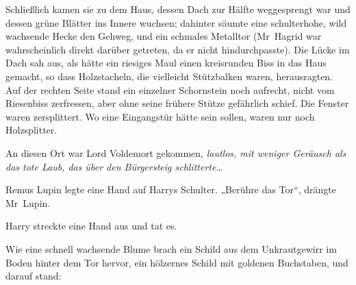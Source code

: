 Schließlich kamen sie zu dem Haus, dessen Dach zur Hälfte weggesprengt war und dessen grüne Blätter ins Innere wuchsen; dahinter säumte eine schulterhohe, wild wachsende Hecke den Gehweg, und ein schmales Metalltor (Mr~Hagrid war wahrscheinlich direkt darüber getreten, da er nicht hindurchpasste).
Die Lücke im Dach sah aus, als hätte ein riesiges Maul einen kreisrunden Biss in das Haus gemacht, so dass Holzstacheln, die vielleicht Stützbalken waren, herausragten. Auf der rechten Seite stand ein einzelner Schornstein noch aufrecht, nicht vom Riesenbiss zerfressen, aber ohne seine frühere Stütze gefährlich schief. Die Fenster waren zersplittert. Wo eine Eingangstür hätte sein sollen, waren nur noch Holzsplitter.

An diesen Ort war Lord Voldemort gekommen, \emph{lautlos, mit weniger Geräusch als das tote Laub, das über den Bürgersteig schlitterte…}

Remus Lupin legte eine Hand auf Harrys Schulter.
„Berühre das Tor“, drängte Mr~Lupin.

Harry streckte eine Hand aus und tat es.

Wie eine schnell wachsende Blume brach ein Schild aus dem Unkrautgewirr im Boden hinter dem Tor hervor, ein hölzernes Schild mit goldenen Buchstaben, und darauf stand:

